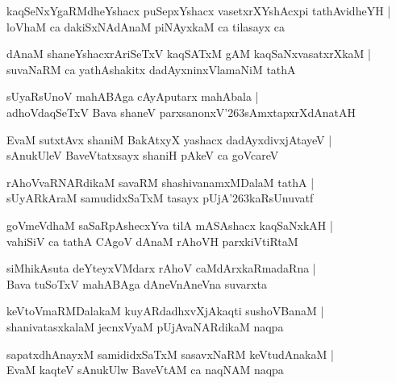 \documentclass[twoside,12pt,openright]{book}
\def\S{\char'263}
\newcounter{shloka}[chapter]
\begin{document}
\begin{shloka}%
kaqSeNxYgaRMdheYshacx puSepxYshacx vasetxrXYshAcxpi tathAvidheYH |\\
loVhaM ca dakiSxNAdAnaM piNAyxkaM ca tilasayx ca 
\end{shloka}

\begin{shloka}%
dAnaM shaneYshacxrAriSeTxV kaqSATxM gAM kaqSaNxvasatxrXkaM |\\
suvaNaRM ca yathAshakitx dadAyxninxVlamaNiM tathA 
\end{shloka}

\begin{shloka}%
sUyaRsUnoV mahABAga cAyAputarx mahAbala |\\
adhoVdaqSeTxV Bava shaneV parxsanonxV\S sAmxtapxrXdAnatAH 
\end{shloka}

\begin{shloka}%
EvaM sutxtAvx shaniM BakAtxyX yashacx dadAyxdivxjAtayeV |\\
sAnukUleV BaveVtatxsayx shaniH pAkeV ca goVcareV 
\end{shloka}

\begin{shloka}%
rAhoVvaRNARdikaM savaRM shashivanamxMDalaM tathA |\\
sUyARkAraM samudidxSaTxM tasayx pUjA\S kaRsUnuvatf 
\end{shloka}

\begin{shloka}%
goVmeVdhaM saSaRpAshecxYva tilA mASAshacx kaqSaNxkAH |\\
vahiSiV ca tathA CAgoV dAnaM rAhoVH parxkiVtiRtaM 
\end{shloka}

\begin{shloka}%
siMhikAsuta deYteyxVMdarx rAhoV caMdArxkaRmadaRna |\\
Bava tuSoTxV mahABAga dAneVnAneVna suvarxta 
\end{shloka}

\begin{shloka}%
keVtoVmaRMDalakaM kuyARdadhxvXjAkaqti sushoVBanaM |\\
shanivatasxkalaM jecnxVyaM pUjAvaNARdikaM naqpa
\end{shloka}

\begin{shloka}%
sapatxdhAnayxM samididxSaTxM sasavxNaRM keVtudAnakaM |\\
EvaM kaqteV sAnukUlw BaveVtAM ca naqNAM naqpa
\end{shloka}
\end{document}
